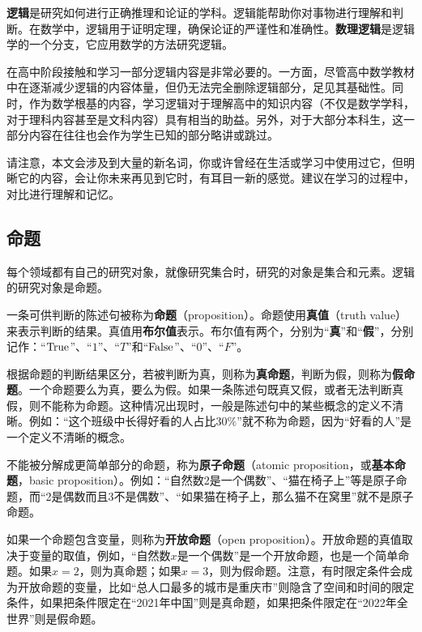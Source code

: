 

\begin{issues}
\issueDraft
\end{issues}


\textbf{逻辑}是研究如何进行正确推理和论证的学科。逻辑能帮助你对事物进行理解和判断。在数学中，逻辑用于证明定理，确保论证的严谨性和准确性。\textbf{数理逻辑}是逻辑学的一个分支，它应用数学的方法研究逻辑。

在高中阶段接触和学习一部分逻辑内容是非常必要的。一方面，尽管高中数学教材中在逐渐减少逻辑的内容体量，但仍无法完全删除逻辑部分，足见其基础性。同时，作为数学根基的内容，学习逻辑对于理解高中的知识内容（不仅是数学学科，对于理科内容甚至是文科内容）具有相当的助益。另外，对于大部分本科生，这一部分内容在往往也会作为学生已知的部分略讲或跳过。

请注意，本文会涉及到大量的新名词，你或许曾经在生活或学习中使用过它，但明晰它的内容，会让你未来再见到它时，有耳目一新的感觉。建议在学习的过程中，对比进行理解和记忆。

\subsection{命题}

每个领域都有自己的研究对象，就像研究集合时，研究的对象是集合和元素。逻辑的研究对象是命题。

一条可供判断的陈述句被称为\textbf{命题}（proposition）。命题使用\textbf{真值}（truth value）来表示判断的结果。真值用\textbf{布尔值}表示。布尔值有两个，分别为“\textbf{真}”和“\textbf{假}”，分别记作：“${\rm True}$”、“$1$”、“$T$”和“${\rm False}$”、“$0$”、“$F$”。

根据命题的判断结果区分，若被判断为真，则称为\textbf{真命题}，判断为假，则称为\textbf{假命题}。一个命题要么为真，要么为假。如果一条陈述句既真又假，或者无法判断真假，则不能称为命题。这种情况出现时，一般是陈述句中的某些概念的定义不清晰。例如：“这个班级中长得好看的人占比$30\%$”就不称为命题，因为“好看的人”是一个定义不清晰的概念。

不能被分解成更简单部分的命题，称为\textbf{原子命题}（atomic proposition，或\textbf{基本命题}，basic proposition）。例如：“自然数2是一个偶数”、“猫在椅子上”等是原子命题，而“2是偶数而且3不是偶数”、“如果猫在椅子上，那么猫不在窝里”就不是原子命题。

如果一个命题包含变量，则称为\textbf{开放命题}（open proposition）。开放命题的真值取决于变量的取值，例如，“自然数$x$是一个偶数”是一个开放命题，也是一个简单命题。如果$x=2$，则为真命题；如果$x=3$，则为假命题。注意，有时限定条件会成为开放命题的变量，比如“总人口最多的城市是重庆市”则隐含了空间和时间的限定条件，如果把条件限定在“2021年中国”则是真命题，如果把条件限定在“2022年全世界”则是假命题。

